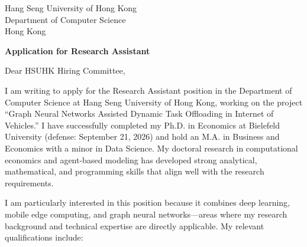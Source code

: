 \documentclass[11pt]{article}
\begin{document}
\vspace{0.1cm}

\noindent
Hang Seng University of Hong Kong \\
Department of Computer Science \\
Hong Kong

\vspace{0.12cm}

\noindent
\textbf{Application for Research Assistant}

\vspace{0.1cm}

\noindent Dear HSUHK Hiring Committee,

I am writing to apply for the Research Assistant position in the Department of Computer Science at Hang Seng University of Hong Kong, working on the project ``Graph Neural Networks Assisted Dynamic Task Offloading in Internet of Vehicles.'' I have successfully completed my Ph.D. in Economics at Bielefeld University (defense: September 21, 2026) and hold an M.A. in Business and Economics with a minor in Data Science. My doctoral research in computational economics and agent-based modeling has developed strong analytical, mathematical, and programming skills that align well with the research requirements.

I am particularly interested in this position because it combines deep learning, mobile edge computing, and graph neural networks—areas where my research background and technical expertise are directly applicable. My relevant qualifications include:
\end{document}
